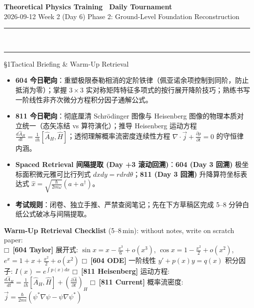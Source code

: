 \documentclass[a4paper,11pt]{article}
\newcommand{\checkbox}{\ensuremath{\mdlgwhtsquare}}
\newcommand{\alerttag}[1]{\textcolor{wine}{\sffamily\bfseries [#1]}}
\begin{document}
\begin{center}
  {\LARGE\bfseries\color{navy} Theoretical Physics Training \textperiodcentered\ Daily Tournament}\\[3pt]
  {\small\sffamily\color{mist} 2026-09-12 \quad\textbar\quad Week 2 (Day 6) \quad\textbar\quad Phase 2: Ground-Level Foundation Reconstruction}\\[-4pt]
  {\color{navy}\rule{\textwidth}{0.8pt}}\\[-11pt]
  {\color{border}\rule{\textwidth}{0.3pt}}
\end{center}

\vspace{-6pt}

\begin{briefing}{\S 1\quad Tactical Briefing \& Warm-Up Retrieval}
\begin{itemize}[leftmargin=1.5em, itemsep=2pt, topsep=1pt]
  \item \textbf{604 今日靶向}：重塑极限泰勒相消的定阶铁律（佩亚诺余项控制到同阶，防止抵消为零）；掌握 $3\times 3$ 实对称矩阵特征多项式的按行展开降阶技巧；熟练书写一阶线性非齐次微分方程积分因子通解公式。
  \item \textbf{811 今日靶向}：彻底厘清 Schrödinger 图像与 Heisenberg 图像的物理本质对立统一（态矢冻结 vs 算符演化）；推导 Heisenberg 运动方程 $\frac{d\hat{A}_H}{dt} = \frac{1}{i\hbar}[\hat{A}_H, \hat{H}]$；透彻理解概率流密度连续性方程 $\nabla \cdot \vec{j} + \frac{\partial \rho}{\partial t} = 0$ 的守恒律内涵。
  \item \textbf{Spaced Retrieval 间隔提取 (Day +3 滚动回溯)}：\textbf{604 (Day 3 回溯)} 极坐标面积微元雅可比行列式 $dxdy = rdrd\theta$；\textbf{811 (Day 3 回溯)} 升降算符坐标表达式 $\hat{x} = \sqrt{\frac{\hbar}{2m\omega}}(a+a^\dagger)$。
  \item \textbf{考试规则}：闭卷、独立手推、严禁查阅笔记；先在下方草稿区完成 5--8 分钟白纸公式破冰与间隔提取。
\end{itemize}

\vspace{1mm}
\textbf{Warm-Up Retrieval Checklist} (5--8\,min): without notes, write on scratch paper:\\
\checkbox\ \alerttag{604 Taylor} 展开式: $\sin x = x - \frac{x^3}{6} + o(x^3)$, $\cos x = 1 - \frac{x^2}{2} + o(x^2)$, $e^x = 1 + x + \frac{x^2}{2} + o(x^2)$ \quad
\checkbox\ \alerttag{604 ODE} 一阶线性 $y' + p(x)y = q(x)$ 积分因子: $I(x) = e^{\int p(x)dx}$ \quad
\checkbox\ \alerttag{811 Heisenberg} 运动方程: $\frac{d\hat{A}_H}{dt} = \frac{1}{i\hbar}[\hat{A}_H, \hat{H}] + \left(\frac{\partial\hat{A}}{\partial t}\right)_H$ \quad
\checkbox\ \alerttag{811 Current} 概率流密度: $\vec{j} = \frac{\hbar}{2mi}(\psi^* \nabla \psi - \psi \nabla \psi^*)$
\end{briefing}
\end{document}
